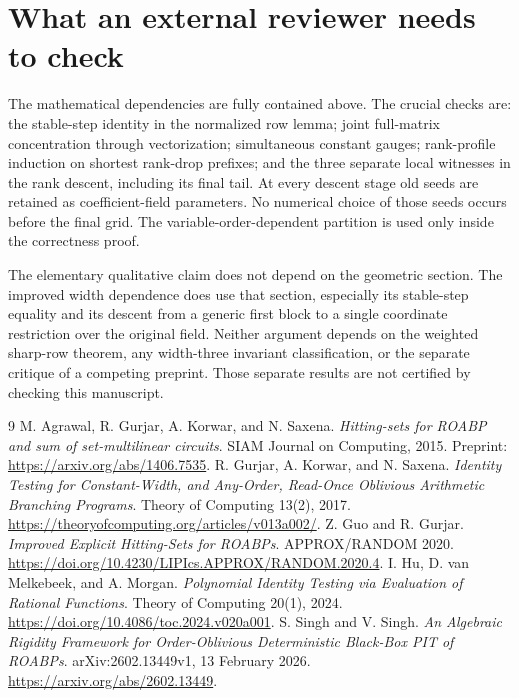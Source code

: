 \documentclass[11pt]{article}
\theoremstyle{definition}\newtheorem{definition}[theorem]{Definition}
\theoremstyle{remark}\newtheorem{remark}[theorem]{Remark}
\begin{document}
\section{What an external reviewer needs to check}
The mathematical dependencies are fully contained above. The crucial checks are: the stable-step identity in the normalized row lemma; joint full-matrix concentration through vectorization; simultaneous constant gauges; rank-profile induction on shortest rank-drop prefixes; and the three separate local witnesses in the rank descent, including its final tail. At every descent stage old seeds are retained as coefficient-field parameters. No numerical choice of those seeds occurs before the final grid. The variable-order-dependent partition is used only inside the correctness proof.

The elementary qualitative claim does not depend on the geometric section. The improved width dependence does use that section, especially its stable-step equality and its descent from a generic first block to a single coordinate restriction over the original field. Neither argument depends on the weighted sharp-row theorem, any width-three invariant classification, or the separate critique of a competing preprint. Those separate results are not certified by checking this manuscript.
\begin{thebibliography}{9}
 M. Agrawal, R. Gurjar, A. Korwar, and N. Saxena.
\emph{Hitting-sets for ROABP and sum of set-multilinear circuits}.
SIAM Journal on Computing, 2015. Preprint:
\url{https://arxiv.org/abs/1406.7535}.
 R. Gurjar, A. Korwar, and N. Saxena.
\emph{Identity Testing for Constant-Width, and Any-Order, Read-Once
Oblivious Arithmetic Branching Programs}. Theory of Computing 13(2), 2017.
\url{https://theoryofcomputing.org/articles/v013a002/}.
 Z. Guo and R. Gurjar.
\emph{Improved Explicit Hitting-Sets for ROABPs}. APPROX/RANDOM 2020.
\url{https://doi.org/10.4230/LIPIcs.APPROX/RANDOM.2020.4}.
 I. Hu, D. van Melkebeek, and A. Morgan.
\emph{Polynomial Identity Testing via Evaluation of Rational Functions}.
Theory of Computing 20(1), 2024.
\url{https://doi.org/10.4086/toc.2024.v020a001}.
 S. Singh and V. Singh.
\emph{An Algebraic Rigidity Framework for Order-Oblivious Deterministic
Black-Box PIT of ROABPs}. arXiv:2602.13449v1, 13 February 2026.
\url{https://arxiv.org/abs/2602.13449}.
\end{thebibliography}
\end{document}
